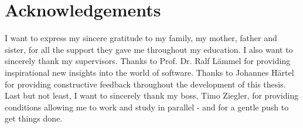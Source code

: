 \chapter*{Acknowledgements}
I want to express my sincere gratitude to my family, my mother, father and sister, for all the support they gave me throughout my education.
\newline
\vspace*{.1in}
\newline
\noindent
I also want to sincerely thank my supervisors.
Thanks to Prof. Dr. Ralf Lämmel for providing inspirational new insights into the world of software.
Thanks to Johannes Härtel for providing constructive feedback throughout the development of this thesis.
\newline
\vspace*{.1in}
\newline
\noindent
Last but not least, I want to sincerely thank my boss, Timo Ziegler, for providing conditions allowing me to work and study in parallel - and for a gentle push to get things done.
